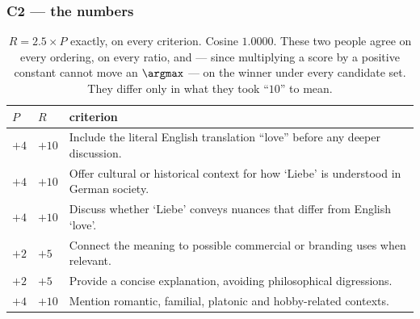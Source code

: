 
\subsubsection{C2 --- the numbers}
\label{sec:c2def}




\begin{table}[H]\centering\footnotesize
\begin{tabularx}{\textwidth}{P{0.8cm}P{0.8cm}Y}
\toprule
$P$ & $R$ & criterion\\
\midrule
$+4$ & $+10$ & Include the literal English translation ``love'' before any deeper discussion.\\
$+4$ & $+10$ & Offer cultural or historical context for how `Liebe' is understood in German society.\\
$+4$ & $+10$ & Discuss whether `Liebe' conveys nuances that differ from English `love'.\\
$+2$ & $+5$ & Connect the meaning to possible commercial or branding uses when relevant.\\
$+2$ & $+5$ & Provide a concise explanation, avoiding philosophical digressions.\\
$+4$ & $+10$ & Mention romantic, familial, platonic and hobby-related contexts.\\
\bottomrule
\end{tabularx}
\caption{$R = 2.5 \times P$ exactly, on every criterion. Cosine $1.0000$. These
two people agree on every ordering, on every ratio, and --- since multiplying a
score by a positive constant cannot move an $\argmax$ --- on the winner under
every candidate set. They differ only in what they took ``$10$'' to mean.}
\label{tab:c2scale}
\end{table}

